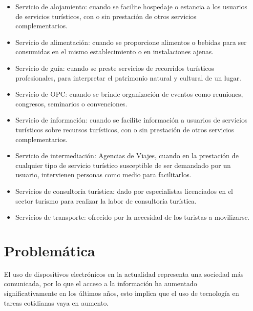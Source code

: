 	\begin{itemize}
	 	\item Servicio de alojamiento: cuando se facilite hospedaje o estancia a los usuarios de servicios turísticos, con o sin prestación de otros servicios complementarios.
	
	 	\item Servicio de alimentación: cuando se proporcione alimentos o bebidas para ser consumidas en el mismo establecimiento o en instalaciones ajenas.
	
	 	\item Servicio de guía: cuando se preste servicios de recorridos turísticos profesionales, para interpretar el patrimonio natural y cultural de un lugar.
	
		\item Servicio de OPC: cuando se brinde organización de eventos como reuniones, congresos, seminarios o convenciones.
	
	 	\item Servicio de información: cuando se facilite información a usuarios de servicios turísticos sobre recursos turísticos, con o sin prestación de otros servicios complementarios.
	
		\item Servicio de intermediación: Agencias de Viajes, cuando en la prestación de cualquier tipo de servicio turístico susceptible de ser demandado por un usuario, intervienen personas como medio para facilitarlos.
	
		\item Servicios de consultoría turística: dado por especialistas licenciados en el sector turismo para realizar la labor de consultoría turística.
	
	 	\item Servicios de transporte: ofrecido por la necesidad de los turistas a movilizarse.
	
	\end{itemize}



\section{Problemática}

	
	El uso de dispositivos electrónicos en la actualidad representa una sociedad más comunicada, por lo que el acceso a la información ha aumentado significativamente en los últimos años, esto implica que el uso de tecnología en tareas cotidianas vaya en aumento.\\
	
